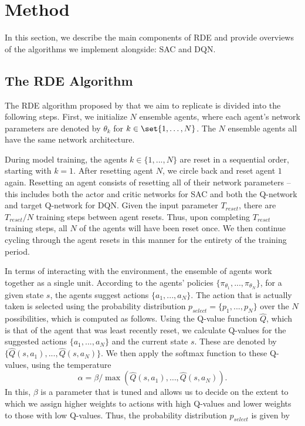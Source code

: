 \documentclass[base]{subfiles}
\begin{document}
\section{Method}
\label{sec:method}

In this section, we describe the main components of RDE and provide overviews of the algorithms we implement alongside: SAC and DQN.

\subsection{The RDE Algorithm}

The RDE algorithm proposed by \cite{kim2023} that we aim to replicate is divided into the following steps.
First, we initialize $N$ ensemble agents, where each agent's network parameters are denoted by $\theta_k$ for $k \in \set{1, \dots, N}$.
The $N$ ensemble agents all have the same network architecture.

During model training, the agents $k \in \{ 1,...,N \}$ are reset in a sequential order, starting with $k=1$.
After resetting agent $N$, we circle back and reset agent $1$ again.
Resetting an agent consists of resetting all of their network parameters -- this includes both the actor and critic networks for SAC and both the Q-network and target Q-network for DQN.
Given the input parameter $T_{reset}$, there are $T_{reset} / N$ training steps between agent resets.
Thus, upon completing $T_{reset}$ training steps, all $N$ of the agents will have been reset once.
We then continue cycling through the agent resets in this manner for the entirety of the training period.

In terms of interacting with the environment, the ensemble of agents work together as a single unit.
According to the agents' policies $\{ \pi_{\theta_1}, ..., \pi_{\theta_N} \}$, for a given state $s$, the agents suggest actions $\{ a_1, ..., a_N \}$.
The action that is actually taken is selected using the probability distribution $p_{select} = \{ p_1, ..., p_N \}$ over the $N$ possibilities, which is computed as follows.
Using the Q-value function $\hat{Q}$, which is that of the agent that was least recently reset, we calculate Q-values for the suggested actions $\{ a_1, ..., a_N \}$ and the current state $s$.
These are denoted by $\{ \hat{Q} (s, a_1), ..., \hat{Q} (s, a_N) \}$.
We then apply the softmax function to these Q-values, using the temperature
\[\alpha = \beta / \max(\hat{Q} (s, a_1), \dots, \hat{Q} (s, a_N)).\]
In this, $\beta$ is a parameter that is tuned and allows us to decide on the extent to which we assign higher weights to actions with high Q-values and lower weights to those with low Q-values.
Thus, the probability distribution $p_{select}$ is given by
\end{document}
